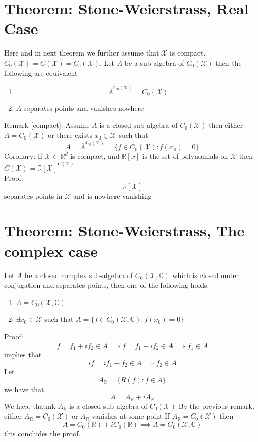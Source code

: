 \documentclass[11pt]{article}
\begin{document}
\section{Theorem: Stone-Weierstrass, Real Case}
Here and in next theorem we further assume that
$ \mathcal{X}$ is compact. $C_0( \mathcal{X}) = C( \mathcal{X}) = C_c( \mathcal{X})$.
Let $ A$ be  a sub-algebra  of $ C_0( \mathcal{X})$ then the following are equivalent
\begin{enumerate}
    \item 
        \[
        \overline{ A}^{C_0( \mathcal{X})} = C_0( \mathcal{X})
        \] 
    \item $A$ separates points and vanishes nowhere
\end{enumerate}
Remark [compact]: Assume  $A$ is a closed sub-algebra of   $C_0 ( \mathcal{X})$ then either 
$A = C_0( \mathcal{X})$ or there exists $x_0 \in \mathcal{X}$ such that
\[
    A = \overline{A}^{C_0( \mathcal{X})} = \{f \in C_0( \mathcal{X}) : f(x_{0}) = 0\}
\] 
Corollary: If $  \mathcal{X} \subset \mathbb{R}^{d}$ is compact, and $ \mathbb{R}[x]$ is the set of polynomials
on $ \mathcal{X}$ then $ C( \mathcal{X}) = \overline{ \mathbb{R}[ \mathcal{X}]}^{C( \mathcal{X})}$\\
Proof:
\[
    \mathbb{R}[ \mathcal{X}]
\] 
separates points in $ \mathcal{X}$ and is nowhere vanishing

\section{Theorem: Stone-Weierstrass, The complex case}
Let $A$ be a closed complex sub-algebra of  $C_{0}( \mathcal{X}, \mathbb{C})$ which is closed under conjugation
and separates points, then one of the following holds.
\begin{enumerate}
    \item $A = C_0( \mathcal{X}, \mathbb{C})$
    \item $\exists x_0 \in \mathcal{X}$ such that $A = \{f \in C_0( \mathcal{X}, \mathbb{C}) : f(x_0) = 0\}$
\end{enumerate}
Proof:
\[
f = f_1 + if_2 \in A \implies \overline{f} = f_1 - if_2 \in A \implies f_1 \in A
\] 
implies that
\[
if = if_1 - f_2 \in A \implies f_2 \in A
\] 
Let 
\[
    A_{ \mathbb{R}} = \{R(f) : f \in A\}
\] 
we have that
\[
    A = A_{ \mathbb{R}} + i A_{ \mathbb{R}}
\] 
We have thatmk $ A_{ \mathbb{R}}$ is a closed sub-algebra of $ C_0 ( \mathcal{X})$ By the previous remark,
either $ A_{ \mathbb{R}} = C_0( \mathcal{X})$  or $A_ \mathbb{R}$ vanishes at some point
If $A_{ \mathbb{R}} = C_0( \mathcal{X})$ then
\[
A = C_0( \mathbb{R}) + i  C_0( \mathbb{R}) \implies A = C_0( \mathcal{X}, \mathbb{C})
\] 
this concludes the proof.
\end{document}
